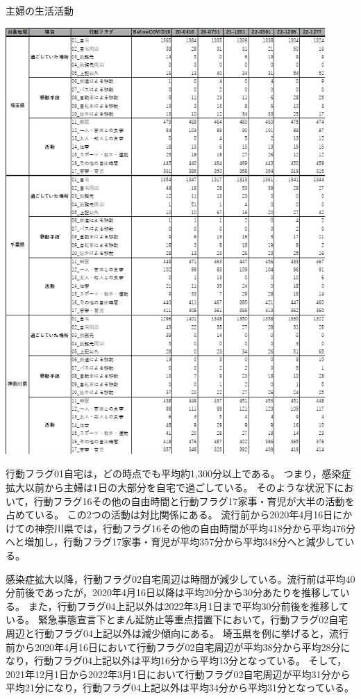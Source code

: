 \documentclass[paper={210mm,297mm},fontsize=15Q,line_length=35zw,number_of_lines=31,head_space=30mm,gutter=40mm,baselineskip=2.0zw,headfoot_verticalposition=1.5zw]{jlreq}
\begin{document}
\begin{table}[H]
  \centering
  \caption{主婦の生活活動}
  \includegraphics[width=122mm]{../Figure/c04s05_table_主婦_生活活動.png}
  \label{生活活動_主婦}
\end{table}

行動フラグ01自宅は，どの時点でも平均約1,300分以上である。
つまり，感染症拡大以前から主婦は1日の大部分を自宅で過ごしている。
そのような状況下において，行動フラグ16その他の自由時間と行動フラグ17家事・育児が大半の活動を占めている。
この2つの活動は対比関係にある。
流行前から2020年4月16日にかけての神奈川県では，行動フラグ16その他の自由時間が平均418分から平均476分へと増加し，行動フラグ17家事・育児が平均357分から平均348分へと減少している。

感染症拡大以降，行動フラグ02自宅周辺は時間が減少している。流行前は平均40分前後であったが，2020年4月16日以降は平均20分から30分あたりを推移している。
また，行動フラグ04上記以外は2022年3月1日まで平均30分前後を推移している。
緊急事態宣言下とまん延防止等重点措置下において，行動フラグ02自宅周辺と行動フラグ04上記以外は減少傾向にある。
埼玉県を例に挙げると，流行前から2020年4月16日において行動フラグ02自宅周辺が平均38分から平均28分になり，行動フラグ04上記以外は平均16分から平均13分となっている。
そして，2021年12月1日から2022年3月1日において行動フラグ02自宅周辺が平均31分から平均21分になり，行動フラグ04上記以外は平均34分から平均31分となっている。
\end{document}
